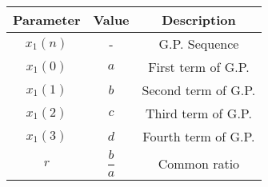 \begin{tabular}{|c|c|c|}
    \hline
     \textbf{Parameter} & \textbf{Value} &
     \textbf{Description}\\
    \hline 
     $x_1(n)$ &  - & G.P. Sequence\\
    \hline 
    $x_1(0)$ & $a$ & First term of G.P. \\
    \hline
     $x_1(1)$ & $b$ & Second term of G.P. \\
    \hline
     $x_1(2)$ & $c$ & Third term of G.P. \\
    \hline
   $x_1(3)$ & $d$ & Fourth term of G.P. \\
    \hline
    $r$ & $\dfrac{b}{a}$ & Common ratio \\
   
    \hline
								      
\end{tabular}